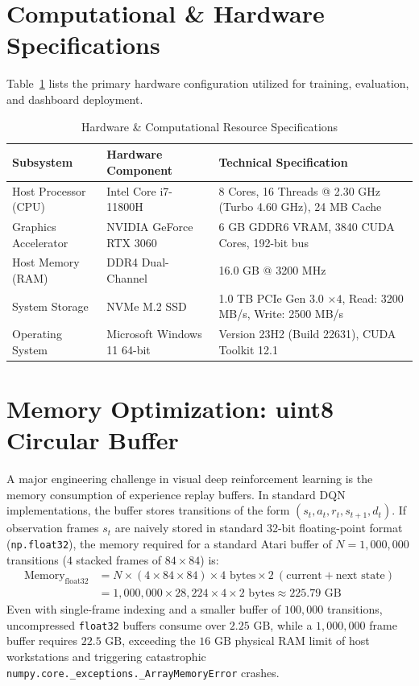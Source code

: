 \documentclass[12pt,a4paper]{report}
\begin{document}
\section{Computational \& Hardware Specifications}
Table~\ref{tab:hardware_specs} lists the primary hardware configuration utilized for training, evaluation, and dashboard deployment.

\begin{table}[htbp]
\centering
\caption{Hardware \& Computational Resource Specifications}
\label{tab:hardware_specs}
\begin{tabular}{@{}llp{8.5cm}@{}}
\toprule
\textbf{Subsystem} & \textbf{Hardware Component} & \textbf{Technical Specification} \\ \midrule
Host Processor (CPU) & Intel Core i7-11800H & 8 Cores, 16 Threads @ 2.30 GHz (Turbo 4.60 GHz), 24 MB Cache \\
Graphics Accelerator & NVIDIA GeForce RTX 3060 & 6 GB GDDR6 VRAM, 3840 CUDA Cores, 192-bit bus \\
Host Memory (RAM) & DDR4 Dual-Channel & 16.0 GB @ 3200 MHz \\
System Storage & NVMe M.2 SSD & 1.0 TB PCIe Gen 3.0 $\times 4$, Read: 3200 MB/s, Write: 2500 MB/s \\
Operating System & Microsoft Windows 11 64-bit & Version 23H2 (Build 22631), CUDA Toolkit 12.1 \\ \bottomrule
\end{tabular}
\end{table}

\section{Memory Optimization: uint8 Circular Buffer}
A major engineering challenge in visual deep reinforcement learning is the memory consumption of experience replay buffers. In standard DQN implementations, the buffer stores transitions of the form $(s_t, a_t, r_t, s_{t+1}, d_t)$. If observation frames $s_t$ are naively stored in standard 32-bit floating-point format (\texttt{np.float32}), the memory required for a standard Atari buffer of $N = 1,000,000$ transitions ($4$ stacked frames of $84 \times 84$) is:
\begin{align}
    \text{Memory}_{\text{float32}} &= N \times (4 \times 84 \times 84) \times 4\text{ bytes} \times 2 \ (\text{current} + \text{next state}) \nonumber \\
    &= 1,000,000 \times 28,224 \times 4 \times 2\text{ bytes} \approx 225.79\text{ GB}
\end{align}
Even with single-frame indexing and a smaller buffer of $100,000$ transitions, uncompressed \texttt{float32} buffers consume over $2.25\text{ GB}$, while a $1,000,000$ frame buffer requires $22.5\text{ GB}$, exceeding the $16\text{ GB}$ physical RAM limit of host workstations and triggering catastrophic \texttt{numpy.core.\_exceptions.\_ArrayMemoryError} crashes.
\end{document}
